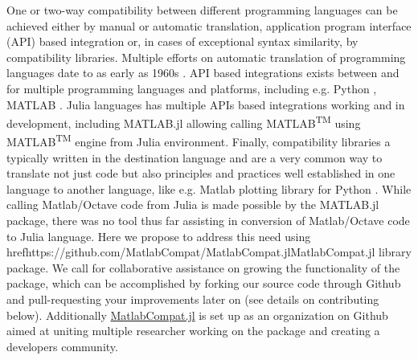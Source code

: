 One or two-way compatibility between different programming languages can be achieved either by manual or automatic translation, application program interface (API) based integration or, in cases of exceptional syntax similarity, by compatibility libraries. Multiple efforts on automatic translation of programming languages date to as early as 1960s \cite{Ledley_1962, irons1961syntax}. API based integrations exists between and for multiple programming languages and platforms, including e.g. Python \cite{autin2012upy}, MATLAB \cite{Bornstein_2008}. Julia languages has multiple APIs based integrations working and in development, including MATLAB.jl allowing calling MATLAB\textsuperscript{TM} using MATLAB\textsuperscript{TM} engine from Julia environment. Finally, compatibility libraries a typically written in the destination language and are a very common way to translate not just code but also principles and practices well established in one language to another language, like e.g. Matlab plotting library for Python \cite{Hunter_2007, barrett2005matplotlib}. While calling Matlab/Octave code from Julia is made possible by the MATLAB.jl package, there was no tool thus far assisting in conversion of Matlab/Octave 
code to Julia language. Here we propose to address this need using href{https://github.com/MatlabCompat/MatlabCompat.jl}{MatlabCompat.jl} library package. We call for collaborative assistance on growing the functionality of the package, which can be accomplished by forking our source code through Github and pull-requesting your improvements later on (see details on contributing below). Additionally \href{http://matlabcompat.github.io/}{MatlabCompat.jl} is set up as an organization on Github aimed at uniting multiple researcher working on the package and creating a developers community.